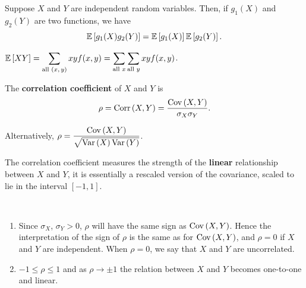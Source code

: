 \begin{theorem}
    Suppose $X$ and $Y$ are independent random variables. Then, if $g_1(X)$ and
    $g_2(Y)$ are two functions, we have
    \[\mathbb{E}\left[{g_1(X)g_2(Y)}\right] = \mathbb{E}\left[{g_1(X)}\right]\mathbb{E}\left[{g_2(Y)}\right].\]
\end{theorem}

\begin{note}
    $\mathbb{E}\left[{XY}\right] = \displaystyle \sum_{\text{all $(x,y)$}} xyf(x,y) = \displaystyle \sum_{\text{all $x$}} \displaystyle \sum_{\text{all $y$}} xyf(x,y)$.
\end{note}

\pagebreak

\begin{definition}
    The \textbf{correlation coefficient} of $X$ and $Y$ is
    \[\rho = \operatorname{Corr}\left({X,Y}\right) = \frac{\operatorname{Cov}\left({X, Y}\right)}{\sigma_X \sigma_Y}.\]    
\end{definition}

\begin{note}
    Alternatively, $\rho = \displaystyle \frac{\operatorname{Cov}\left({X,Y}\right)}{\sqrt{\operatorname{Var}\left({X}\right) \operatorname{Var}\left({Y}\right)}}$.
\end{note}

The correlation coefficient measures the strength of the \textbf{linear} relationship between $X$ and $Y$, it is essentially
a rescaled version of the covariance, scaled to lie in the interval $[-1, 1]$.




\begin{theorem}
    \phantom{}\
    \begin{enumerate}
        \item Since $\sigma_X$, $\sigma_Y > 0$, $\rho$ will have the same sign as $\operatorname{Cov}\left({X,Y}\right)$. Hence the interpretation of the sign of $\rho$ is the same as for $\operatorname{Cov}\left({X,Y}\right)$, and $\rho = 0$ if $X$ and $Y$ are independent. When $\rho = 0$, we say that $X$ and $Y$ are uncorrelated.
        \item $-1 \leq \rho \leq 1$ and as $\rho \to \pm 1$ the relation between $X$ and $Y$ becomes one-to-one and linear.
    \end{enumerate}
\end{theorem}


